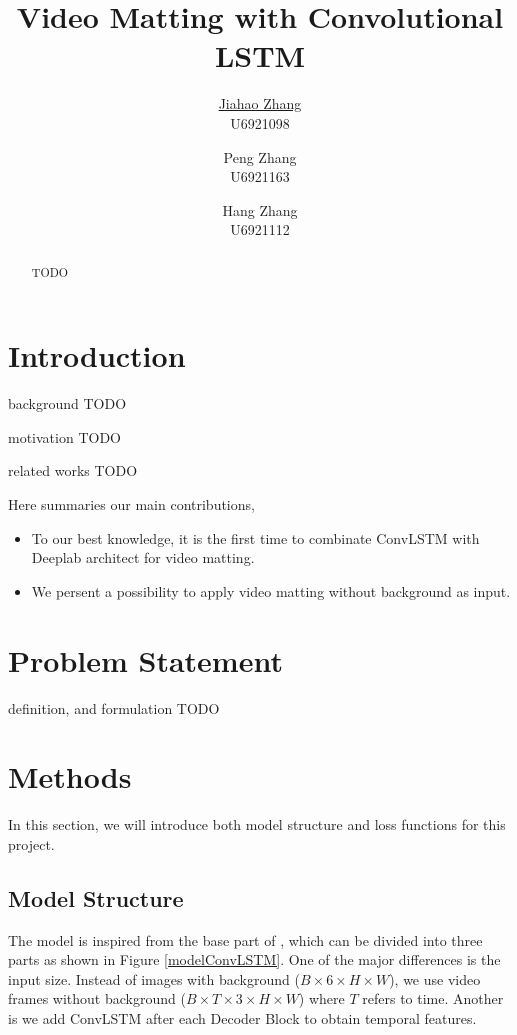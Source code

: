 \documentclass[final]{cvpr}
\begin{document}
\title{Video Matting with Convolutional LSTM}
\author{\underline{Jiahao Zhang} \\ U6921098 \and Peng Zhang \\ U6921163 \and Hang Zhang \\ U6921112}

\maketitle
\begin{abstract}
    TODO
\end{abstract}


\section{Introduction}

background TODO

motivation TODO

related works TODO

Here summaries our main contributions,

\begin{itemize}
    \item To our best knowledge, it is the first time to combinate ConvLSTM with Deeplab architect for video matting.
    \item We persent a possibility to apply video matting without background as input.
\end{itemize}

\section{Problem Statement}

definition, and formulation TODO

\section{Methods}

In this section, we will introduce both model structure and loss functions for this project.

\subsection{Model Structure}

The model is inspired from the base part of \cite{linRealTimeHighResolutionBackground2020a}, which can be divided into three parts as shown in Figure \ref{modelConvLSTM}. One of the major differences is the input size. Instead of images with background ($B\times 6\times H \times W$), we use video frames without background ($B\times T\times 3\times H \times W$) where $T$ refers to time. Another is we add ConvLSTM after each Decoder Block to obtain temporal features.
\end{document}
